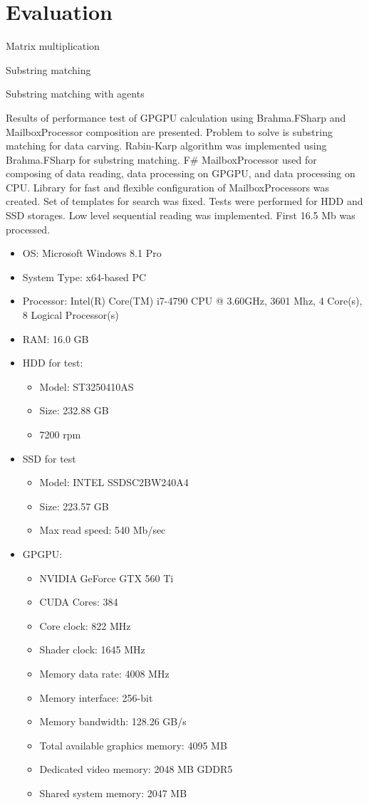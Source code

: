 \section{Evaluation}

Matrix multiplication

Substring matching

Substring matching with agents~\cite{BrahmaStringMatching}

Results of performance test of GPGPU calculation using Brahma.FSharp and MailboxProcessor  composition are presented.
Problem to solve is substring matching for data carving. Rabin-Karp algorithm was implemented using Brahma.FSharp for substring matching.
F\# MailboxProcessor  used for composing of data reading, data processing on GPGPU, and data processing on CPU.
Library for fast and flexible configuration of MailboxProcessors was created.
Set of templates for search was fixed.
Tests were performed for HDD and SSD storages.
Low level sequential reading was implemented.
First 16.5 Mb was processed.

\begin{itemize}
\item OS: Microsoft Windows 8.1 Pro
\item System Type: x64-based PC
\item Processor: Intel(R) Core(TM) i7-4790 CPU @ 3.60GHz, 3601 Mhz, 4 Core(s), 8 Logical Processor(s)
\item RAM: 16.0 GB
\item HDD for test: 
\begin{itemize}
  \item Model: ST3250410AS
  \item Size: 232.88 GB
  \item 7200 rpm
\end{itemize}
 
\item SSD for test
\begin{itemize}
  \item Model: INTEL SSDSC2BW240A4
  \item Size: 223.57 GB
  \item Max read speed: 540 Mb/sec
\end{itemize}

\item GPGPU:
\begin{itemize}
  \item NVIDIA GeForce GTX 560 Ti
  \item CUDA Cores:     384 
  \item Core clock:     822 MHz 
  \item Shader clock:       1645 MHz
  \item Memory data rate:   4008 MHz
  \item Memory interface:   256-bit 
  \item Memory bandwidth:   128.26 GB/s
  \item Total available graphics memory:    4095 MB
  \item Dedicated video memory: 2048 MB GDDR5
  \item Shared system memory:   2047 MB
\end{itemize}
\end{itemize}

